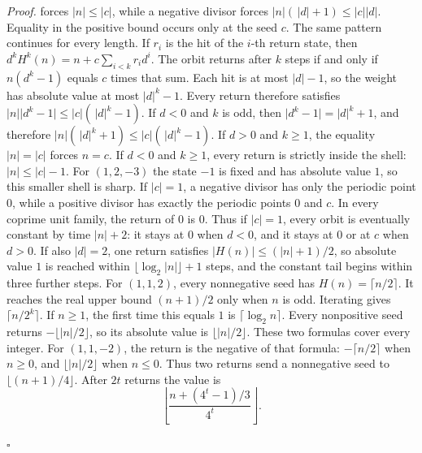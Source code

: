 \documentclass[11pt,letterpaper]{article}
\newenvironment{proof}{\noindent\textit{Proof.}}{\hfill\(\square\)}
\begin{document}
\begin{proof}
forces \(\lvert n\rvert\le\lvert c\rvert\), while a negative divisor forces \(\lvert n\rvert(\,\lvert d\rvert+1)\le\lvert c\rvert\lvert d\rvert\). Equality in the positive bound occurs only at the seed \(c\). The same pattern continues for every length. If \(r_{i}\) is the hit of the \(i\)-th return state, then \(d^{k}H^{k}(n)=n+c\sum_{i<k}r_{i}d^{i}\). The orbit returns after \(k\) steps if and only if \(n(d^{k}-1)\) equals \(c\) times that sum. Each hit is at most \(\lvert d\rvert-1\), so the weight has absolute value at most \(\lvert d\rvert^{k}-1\). Every return therefore satisfies \(\lvert n\rvert\lvert d^{k}-1\rvert\le\lvert c\rvert(\,\lvert d\rvert^{k}-1)\). If \(d<0\) and \(k\) is odd, then \(\lvert d^{k}-1\rvert=\lvert d\rvert^{k}+1\), and therefore \(\lvert n\rvert(\,\lvert d\rvert^{k}+1)\le\lvert c\rvert(\,\lvert d\rvert^{k}-1)\). If \(d>0\) and \(k\ge 1\), the equality \(\lvert n\rvert=\lvert c\rvert\) forces \(n=c\). If \(d<0\) and \(k\ge 1\), every return is strictly inside the shell: \(\lvert n\rvert\le\lvert c\rvert-1\). For \((1,2,-3)\) the state \(-1\) is fixed and has absolute value \(1\), so this smaller shell is sharp. If \(\lvert c\rvert=1\), a negative divisor has only the periodic point \(0\), while a positive divisor has exactly the periodic points \(0\) and \(c\). In every coprime unit family, the return of \(0\) is \(0\). Thus if \(\lvert c\rvert=1\), every orbit is eventually constant by time \(\lvert n\rvert+2\): it stays at \(0\) when \(d<0\), and it stays at \(0\) or at \(c\) when \(d>0\). If also \(\lvert d\rvert=2\), one return satisfies \(\lvert H(n)\rvert\le(\lvert n\rvert+1)/2\), so absolute value \(1\) is reached within \(\lfloor\log_2\lvert n\rvert\rfloor+1\) steps, and the constant tail begins within three further steps. For \((1,1,2)\), every nonnegative seed has \(H(n)=\lceil n/2\rceil\). It reaches the real upper bound \((n+1)/2\) only when \(n\) is odd. Iterating gives \(\lceil n/2^{k}\rceil\). If \(n\ge 1\), the first time this equals \(1\) is \(\lceil\log_2 n\rceil\). Every nonpositive seed returns \(-\lfloor\lvert n\rvert/2\rfloor\), so its absolute value is \(\lfloor\lvert n\rvert/2\rfloor\). These two formulas cover every integer. For \((1,1,-2)\), the return is the negative of that formula: \(-\lceil n/2\rceil\) when \(n\ge 0\), and \(\lfloor\lvert n\rvert/2\rfloor\) when \(n\le 0\). Thus two returns send a nonnegative seed to \(\lfloor(n+1)/4\rfloor\). After \(2t\) returns the value is
\[
\left\lfloor\frac{n+(4^{t}-1)/3}{4^{t}}\right\rfloor.
\]

\end{proof}
\end{document}
